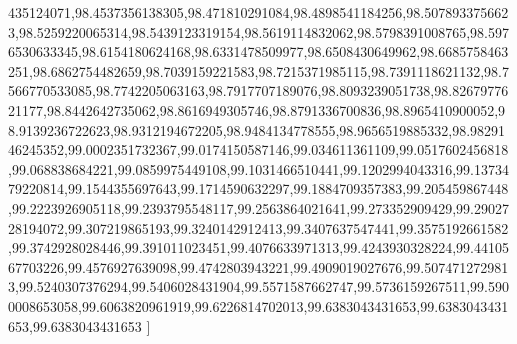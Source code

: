 \begin{pylabcode}[plotsession]
435124071,98.4537356138305,98.471810291084,98.4898541184256,98.5078933756623,98.5259220065314,98.5439123319154,98.5619114832062,98.5798391008765,98.5976530633345,98.6154180624168,98.6331478509977,98.6508430649962,98.6685758463251,98.6862754482659,98.7039159221583,98.7215371985115,98.7391118621132,98.7566770533085,98.7742205063163,98.7917707189076,98.8093239051738,98.8267977621177,98.8442642735062,98.8616949305746,98.8791336700836,98.8965410900052,98.9139236722623,98.9312194672205,98.9484134778555,98.9656519885332,98.9829146245352,99.0002351732367,99.0174150587146,99.034611361109,99.0517602456818,99.068838684221,99.0859975449108,99.1031466510441,99.1202994043316,99.1373479220814,99.1544355697643,99.1714590632297,99.1884709357383,99.205459867448,99.2223926905118,99.2393795548117,99.2563864021641,99.273352909429,99.2902728194072,99.307219865193,99.3240142912413,99.3407637547441,99.3575192661582,99.3742928028446,99.391011023451,99.4076633971313,99.4243930328224,99.4410567703226,99.4576927639098,99.4742803943221,99.4909019027676,99.5074712729813,99.5240307376294,99.5406028431904,99.5571587662747,99.5736159267511,99.5900008653058,99.6063820961919,99.6226814702013,99.6383043431653,99.6383043431653,99.6383043431653 ]

\end{pylabcode}
